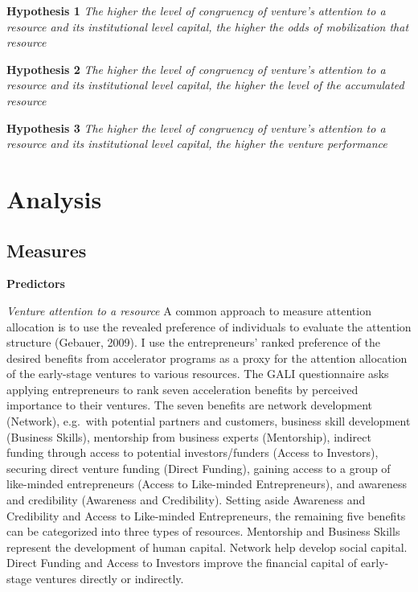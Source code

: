 \documentclass[
  english,
  man]{apa6}
\begin{document}
\textbf{Hypothesis 1} \emph{The higher the level of congruency of venture's attention to a resource and its institutional level capital, the higher the odds of mobilization that resource}

\textbf{Hypothesis 2} \emph{The higher the level of congruency of venture's attention to a resource and its institutional level capital, the higher the level of the accumulated resource}

\textbf{Hypothesis 3} \emph{The higher the level of congruency of venture's attention to a resource and its institutional level capital, the higher the venture performance}

\hypertarget{analysis}{%
\section{Analysis}\label{analysis}}

\hypertarget{measures}{%
\subsection{Measures}\label{measures}}

\textbf{Predictors}

\emph{Venture attention to a resource} A common approach to measure attention allocation is to use the revealed preference of individuals to evaluate the attention structure (Gebauer, 2009). I use the entrepreneurs' ranked preference of the desired benefits from accelerator programs as a proxy for the attention allocation of the early-stage ventures to various resources. The GALI questionnaire asks applying entrepreneurs to rank seven acceleration benefits by perceived importance to their ventures. The seven benefits are network development (Network), e.g.~with potential partners and customers, business skill development (Business Skills), mentorship from business experts (Mentorship), indirect funding through access to potential investors/funders (Access to Investors), securing direct venture funding (Direct Funding), gaining access to a group of like-minded entrepreneurs (Access to Like-minded Entrepreneurs), and awareness and credibility (Awareness and Credibility). Setting aside Awareness and Credibility and Access to Like-minded Entrepreneurs, the remaining five benefits can be categorized into three types of resources. Mentorship and Business Skills represent the development of human capital. Network help develop social capital. Direct Funding and Access to Investors improve the financial capital of early-stage ventures directly or indirectly.
\end{document}

